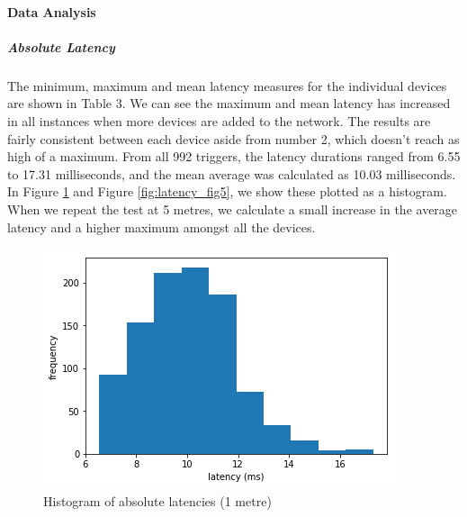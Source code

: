 \paragraph{Data Analysis}

\subparagraph{Absolute Latency}
The minimum, maximum and mean latency measures for the individual devices are shown in Table 3. We can see the maximum and mean latency has increased in all instances when more devices are added to the network. The results are fairly consistent between each device aside from number 2, which doesn’t reach as high of a maximum. From all 992 triggers, the latency durations ranged from 6.55 to 17.31 milliseconds, and the mean average was calculated as 10.03 milliseconds. In Figure \ref{fig:latency_fig4} and Figure \ref{fig:latency_fig5}, we show these plotted as a histogram. When we repeat the test at 5 metres, we calculate a small increase in the average latency and a higher maximum amongst all the devices.


\begin{figure}[ht]
  \centering
    \includegraphics[width=\textwidth]{Chapters/Figures/technical/Latency/figure4.png}
    \caption{Histogram of absolute latencies (1 metre)}
    \label{fig:latency_fig4}
\end{figure}


